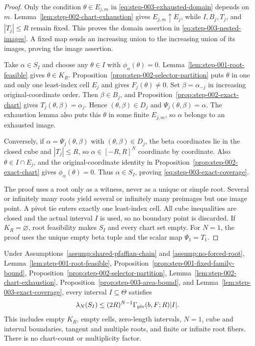 \begin{proof}
Only the condition $\theta\in E_{j,m}$ in
\eqref{eq:step-003-exhausted-domain} depends on $m$.
Lemma~\ref{lem:step-002-chart-exhaustion} gives
$E_{j,m}\uparrow E_j$, while $I,B_j,T_j$, and $|T_j|\leq R$ remain fixed.
This proves the domain assertion in
\eqref{eq:step-003-nested-images}.  A fixed map sends an increasing union to
the increasing union of its images, proving the image assertion.

Take $\alpha\in S_I$ and choose any $\theta\in I$ with
$\phi_\alpha(\theta)=0$.  Lemma~\ref{lem:step-001-root-feasible} gives
$\theta\in K_R$.  Proposition~\ref{prop:step-002-selector-partition} puts
$\theta$ in one and only one least-index cell $E_j$ and gives
$F_j(\theta)\neq0$.  Set $\beta=\alpha_{-j}$ in increasing
original-coordinate order.  Then $\beta\in B_j$, and
Proposition~\ref{prop:step-002-exact-chart} gives
$T_j(\theta,\beta)=\alpha_j$.  Hence $(\theta,\beta)\in D_j$ and
$\Psi_j(\theta,\beta)=\alpha$.  The exhaustion lemma also puts this
$\theta$ in some finite $E_{j,m}$, so $\alpha$ belongs to an exhausted
image.

Conversely, if $\alpha=\Psi_j(\theta,\beta)$ with
$(\theta,\beta)\in D_j$, the beta coordinates lie in the closed cube and
$|T_j|\leq R$, so $\alpha\in[-R,R]^N$ coordinate by coordinate.  Also
$\theta\in I\cap E_j$, and the original-coordinate identity in
Proposition~\ref{prop:step-002-exact-chart} gives
$\phi_\alpha(\theta)=0$.  Thus $\alpha\in S_I$, proving
\eqref{eq:step-003-exact-coverage}.

The proof uses a root only as a witness, never as a unique or simple root.
Several or infinitely many roots yield several or infinitely many preimages
but one image point.  A pivot tie enters exactly one least-index cell.  All
cube inequalities are closed and the actual interval $I$ is used, so no
boundary point is discarded.  If $K_R=\varnothing$, root feasibility makes
$S_I$ and every chart set empty.  For $N=1$, the proof uses the unique empty
beta tuple and the scalar map $\Psi_1=T_1$.
\end{proof}

\begin{proposition}
\label{prop:step-003-volume-certificate}
Under Assumptions~\ref{assump:shared-pfaffian-chain} and
\ref{assump:no-forced-root}, Lemma~\ref{lem:step-001-root-feasible},
Proposition~\ref{prop:step-001-fixed-family-bound},
Proposition~\ref{prop:step-002-selector-partition},
Lemma~\ref{lem:step-002-chart-exhaustion},
Proposition~\ref{prop:step-003-area-bound}, and
Lemma~\ref{lem:step-003-exact-coverage}, every interval
$I\subseteq\Theta$ satisfies
\begin{equation}
\lambda_N(S_I)
\leq(2R)^{N-1}\Gamma_{\rm piv}(b,F;R)|I|.
\label{eq:step-003-volume-certificate}
\end{equation}
This includes empty $K_R$, empty cells, zero-length intervals, $N=1$,
cube and interval boundaries, tangent and multiple roots, and finite or
infinite root fibers.  There is no chart-count or multiplicity factor.
\end{proposition}

